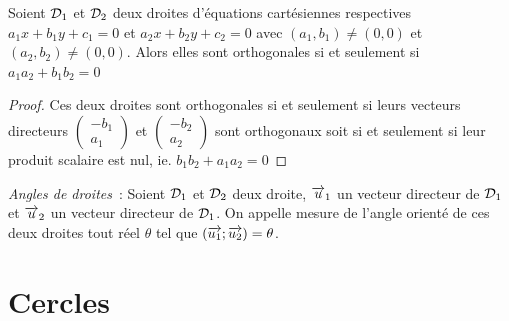 \begin{prop}
  Soient $\mathcal{D}_1$ et $\mathcal{D}_2$ deux droites d'équations cartésiennes respectives $a_1x+b_1y+c_1=0$ et $a_2x+b_2y+c_2=0$ avec $(a_1,b_1) \neq (0,0)$ et $(a_2,b_2) \neq (0,0)$. Alors elles sont orthogonales si et seulement si $a_1 a_2 + b_1 b_2=0$
\end{prop}
\begin{proof}
  Ces deux droites sont orthogonales si et seulement si leurs vecteurs directeurs $\begin{pmatrix} -b_1 \\ a_1 \end{pmatrix}$ et $\begin{pmatrix} -b_2 \\ a_2 \end{pmatrix}$ sont orthogonaux soit si et seulement si leur produit scalaire est nul, ie. $b_1 b_2 + a_1 a_2=0$
\end{proof}

\emph{Angles de droites}~:
Soient $\mathcal{D}_1$ et $\mathcal{D}_2$ deux droite, $\overrightarrow{u}_1$ un vecteur directeur de $\mathcal{D}_1$ et $\overrightarrow{u}_2$ un vecteur directeur de $\mathcal{D}_1$. On appelle mesure de l'angle orienté de ces deux droites tout réel $\theta$ tel que $(\overrightarrow{u_1};\overrightarrow{u_2})=\theta$.

\section{Cercles}
\label{sec:cercle}
